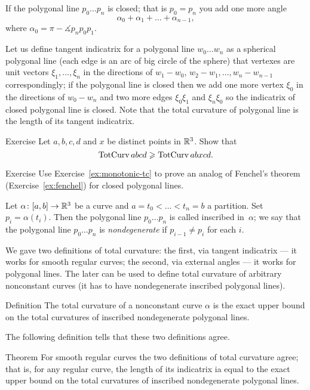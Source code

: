 If the polygonal line $p_0\dots p_n$ is closed; that is $p_0=p_n$ you add one more angle 
\[\alpha_0+\alpha_1+\dots+\alpha_{n-1},\]
where $\alpha_0=\pi-\measuredangle p_{n}p_0p_{1}$.

Let us define tangent indicatrix for a polygonal line $w_0\dots w_n$ as a spherical polygonal line (each edge is an arc of big circle of the sphere) that vertexes are unit vectors $\xi_1,\dots,\xi_n$ in the directions of $w_1-w_0$, $w_2-w_1,\dots, w_n-w_{n-1}$ correspondingly;
if the  polygonal line is closed then we add one more vertex $\xi_0$ in the directions of $w_0-w_n$ and two more edges $\xi_0\xi_1$ and $\xi_n\xi_0$ so the indicatrix of closed polygonal line is closed.
Note that the total curvature of polygonal line is the length of its tangent indicatrix.

\begin{thm}{Exercise}\label{ex:monotonic-tc}
Let $a,b,c,d$ and $x$ be distinct points in $\mathbb{R}^3$.
Show that 
\[\mathop{\rm TotCurv}\nolimits abcd\geqslant \mathop{\rm TotCurv}\nolimits abxcd.\]
\end{thm}

\begin{thm}{Exercise}\label{ex:poly-fenchel}
Use Exercise~\ref{ex:monotonic-tc} to prove an analog of Fenchel's theorem (Exercise~\ref{ex:fenchel}) for closed polygonal lines.
\end{thm}


Let  $\alpha\colon[a,b]\to \mathbb{R}^3$ be a curve and  $a=t_0<\dots<t_n=b$ a partition.
Set $p_i=\alpha(t_i)$.
Then the polygonal line $p_0\dots p_n$ is called inscribed in~$\alpha$;
we say that the polygonal line $p_0\dots p_n$ is \emph{nondegenerate} if $p_{i-1}\ne p_i$ for each $i$. 

We gave two definitions of total curvature:
the first, via tangent indicatrix --- it works for smooth regular curves;
the second, via external angles --- it works for polygonal lines.
The later can be used to define total curvature of arbitrary nonconstant curves (it has to have nondegenerate inscribed polygonal lines).

\begin{thm}{Definition}\label{def:total-curv-poly}
The total curvature of a nonconstant curve $\alpha$ is the exact upper bound on the total curvatures of inscribed nondegenerate polygonal lines.
\end{thm}

The following definition tells that these two definitions agree.

\begin{thm}{Theorem}\label{thm:total-curvature=}
For smooth regular curves the two definitions of total curvature agree;
that is, for any regular curve, the length of its indicatrix ia equal to the exact upper bound on the total curvatures of inscribed nondegenerate polygonal lines.
\end{thm}


